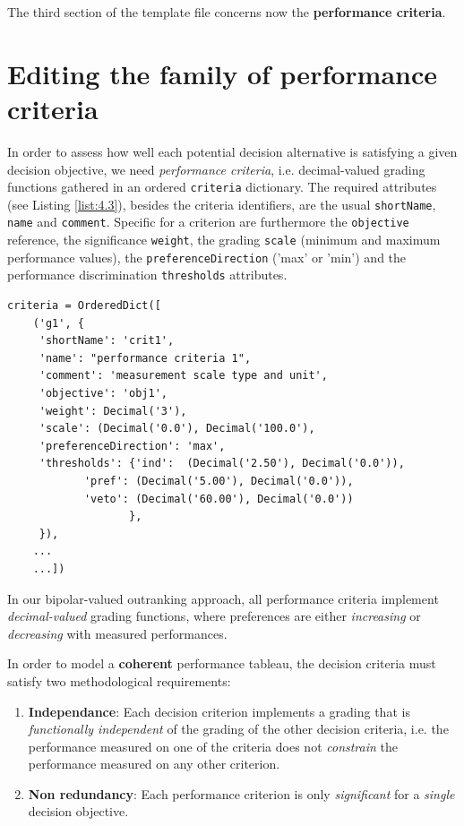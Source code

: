 The third section of the template file concerns now the \textbf{performance criteria}.

\section{Editing the family of performance criteria}
\label{sec:4.4}

In order to assess how well each potential decision alternative is satisfying a given decision objective, we need \emph{performance criteria}, i.e. decimal-valued grading functions gathered in an ordered \texttt{criteria} dictionary. The required attributes (see Listing \ref{list:4.3}), besides the criteria identifiers, are the usual \texttt{shortName}, \texttt{name} and \texttt{comment}. Specific for a criterion are furthermore the \texttt{objective} reference, the significance \texttt{weight}, the grading \texttt{scale} (minimum and  maximum performance values), the \texttt{preferenceDirection} ('max' or 'min') and the performance discrimination \texttt{thresholds} attributes.

\begin{lstlisting}[caption={Example of performance criteria description},label=list:4.3,basicstyle=\footnotesize]
   criteria = OrderedDict([
    ('g1', {
     'shortName': 'crit1',
     'name': "performance criteria 1",
     'comment': 'measurement scale type and unit',
     'objective': 'obj1',
     'weight': Decimal('3'),
     'scale': (Decimal('0.0'), Decimal('100.0'),
     'preferenceDirection': 'max',
     'thresholds': {'ind':  (Decimal('2.50'), Decimal('0.0')),
		    'pref': (Decimal('5.00'), Decimal('0.0')),
		    'veto': (Decimal('60.00'), Decimal('0.0'))
                   },
     }),
    ...
    ...])
\end{lstlisting}

In our bipolar-valued outranking approach, all performance criteria implement \emph{decimal-valued} grading functions, where preferences are either \emph{increasing} or \emph{decreasing} with measured performances.

\begin{svgraybox}In order to model a \textbf{coherent} performance tableau, the decision criteria must satisfy two methodological requirements:
\begin{enumerate}
\item \textbf{Independance}: Each decision criterion implements a grading that is \emph{functionally independent} of the grading of the other decision criteria, i.e. the performance measured on one of the criteria does not \emph{constrain} the performance measured on any other criterion.
\item \textbf{Non redundancy}: Each performance criterion is only \emph{significant} for a \emph{single} decision objective.
\end{enumerate}
\end{svgraybox}

